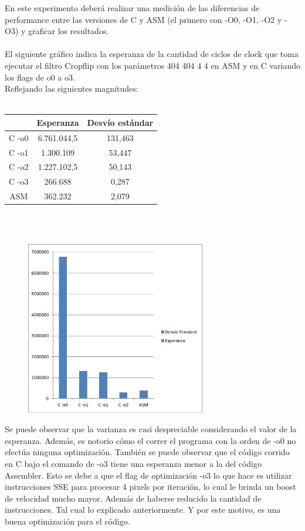 En este experimento deberá realizar una medición de las diferencias de 
performance entre las versiones de C y ASM (el primero con -O0, -O1, -O2 y -O3) 
y graficar los resultados. \\
\\
El siguiente gr\'afico indica la esperanza de la cantidad de ciclos de clock que toma ejecutar el filtro Cropflip con los par\'ametros 404 404 4 4 en ASM y en C variando los flags de o0 a o3. \\
Reflejando las siguientes magnitudes: \\
\\
 \begin{tabular}[c]{|c|c|c|}
	\hline
		 & Esperanza & Desv\'io est\'andar\\
		\hline
C -o0 & 6.761.044,5 & 131,463 \\
\hline
C -o1 & 1.300.109 & 53,447 \\
\hline
C -o2 & 1.227.102,5 & 50,143\\
\hline
C -o3 & 266.688 & 0,287 \\
\hline
ASM & 362.232 & 2,079\\
\hline
	\end{tabular}\\\\

\begin{figure}[h!]
  \begin{center}
	\includegraphics[width=0.7\textwidth]{imagenes/14.jpg}
  \end{center}
\end{figure}


Se puede observar que la varianza es casi despreciable considerando el valor de la esperanza. Adem\'as, es notorio c\'omo el correr el programa con la orden de -o0 no efect\'ua ninguna optimizaci\'on. Tambi\'en se puede observar que el c\'odigo corrido en C bajo el comando de -o3 tiene una esperanza menor a la del c\'odigo Assembler. Esto se debe a que el flag de optimizaci\'on -o3 lo que hace es utilizar instrucciones SSE para procesar 4 pixels por iteración, lo cual le brinda un boost de velocidad mucho mayor. Además de haberse reducido la cantidad de instrucciones. Tal cual lo explicado anteriormente. Y por este motivo, es una buena optimizaci\'on para el c\'odigo.

